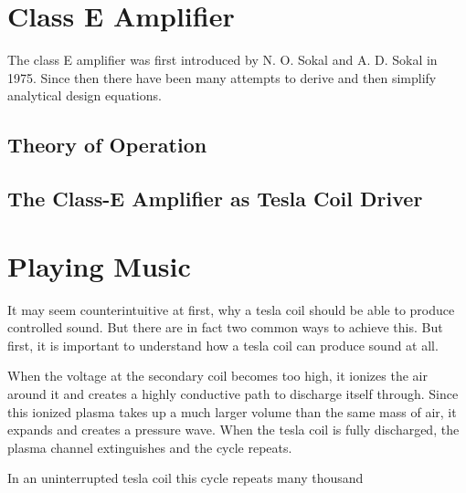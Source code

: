 \section{Class E Amplifier}
The class E amplifier was first introduced by N. O. Sokal and A. D. Sokal in 1975. Since then there have been many attempts to derive  and then simplify analytical design equations.

\subsection{Theory of Operation}

\subsection{The Class-E Amplifier as Tesla Coil Driver}

\section{Playing Music}

It may seem counterintuitive at first, why a tesla coil should be able to produce controlled sound. But there are in fact two common ways to achieve this. But first, it is important to understand how a tesla coil can produce sound at all.

When the voltage at the secondary coil becomes too high, it ionizes the air around it and creates a highly conductive path to discharge itself through. Since this ionized plasma takes up a much larger volume than the same mass of air, it expands and creates a pressure wave. When the tesla coil is fully discharged, the plasma channel extinguishes and the cycle repeats. 

In an uninterrupted tesla coil this cycle repeats many thousand 